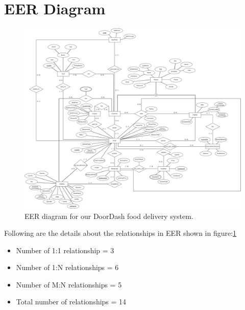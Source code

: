 \documentclass[12pt,letterpaper]{article}
\begin{document}
\section{EER Diagram}
\begin{figure}[H]
 \begin{center}
     \includegraphics[scale=0.25]{figures/eer.png}
     \caption{EER diagram for our DoorDash food delivery system.}
     \label{fig:eer}
 \end{center}
\end{figure}

\par{Following are the details about the relationships in EER shown in figure:\ref{fig:eer}}
\begin{itemize}
    \item Number of 1:1 relationship = 3
    \item Number of 1:N relationships =  6
    \item Number of M:N relationships =  5
    \item Total number of relationships = 14
\end{itemize}
\end{document}
